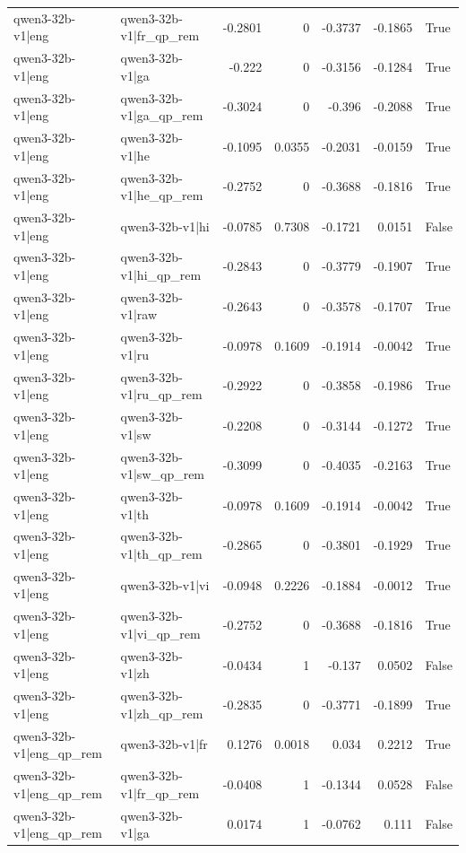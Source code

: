 \begin{table}
\begin{tabular}{l l r r r r l}
qwen3-32b-v1|eng & qwen3-32b-v1|fr_qp_rem & -0.2801 & 0 & -0.3737 & -0.1865 & True \\
qwen3-32b-v1|eng & qwen3-32b-v1|ga & -0.222 & 0 & -0.3156 & -0.1284 & True \\
qwen3-32b-v1|eng & qwen3-32b-v1|ga_qp_rem & -0.3024 & 0 & -0.396 & -0.2088 & True \\
qwen3-32b-v1|eng & qwen3-32b-v1|he & -0.1095 & 0.0355 & -0.2031 & -0.0159 & True \\
qwen3-32b-v1|eng & qwen3-32b-v1|he_qp_rem & -0.2752 & 0 & -0.3688 & -0.1816 & True \\
qwen3-32b-v1|eng & qwen3-32b-v1|hi & -0.0785 & 0.7308 & -0.1721 & 0.0151 & False \\
qwen3-32b-v1|eng & qwen3-32b-v1|hi_qp_rem & -0.2843 & 0 & -0.3779 & -0.1907 & True \\
qwen3-32b-v1|eng & qwen3-32b-v1|raw & -0.2643 & 0 & -0.3578 & -0.1707 & True \\
qwen3-32b-v1|eng & qwen3-32b-v1|ru & -0.0978 & 0.1609 & -0.1914 & -0.0042 & True \\
qwen3-32b-v1|eng & qwen3-32b-v1|ru_qp_rem & -0.2922 & 0 & -0.3858 & -0.1986 & True \\
qwen3-32b-v1|eng & qwen3-32b-v1|sw & -0.2208 & 0 & -0.3144 & -0.1272 & True \\
qwen3-32b-v1|eng & qwen3-32b-v1|sw_qp_rem & -0.3099 & 0 & -0.4035 & -0.2163 & True \\
qwen3-32b-v1|eng & qwen3-32b-v1|th & -0.0978 & 0.1609 & -0.1914 & -0.0042 & True \\
qwen3-32b-v1|eng & qwen3-32b-v1|th_qp_rem & -0.2865 & 0 & -0.3801 & -0.1929 & True \\
qwen3-32b-v1|eng & qwen3-32b-v1|vi & -0.0948 & 0.2226 & -0.1884 & -0.0012 & True \\
qwen3-32b-v1|eng & qwen3-32b-v1|vi_qp_rem & -0.2752 & 0 & -0.3688 & -0.1816 & True \\
qwen3-32b-v1|eng & qwen3-32b-v1|zh & -0.0434 & 1 & -0.137 & 0.0502 & False \\
qwen3-32b-v1|eng & qwen3-32b-v1|zh_qp_rem & -0.2835 & 0 & -0.3771 & -0.1899 & True \\
qwen3-32b-v1|eng_qp_rem & qwen3-32b-v1|fr & 0.1276 & 0.0018 & 0.034 & 0.2212 & True \\
qwen3-32b-v1|eng_qp_rem & qwen3-32b-v1|fr_qp_rem & -0.0408 & 1 & -0.1344 & 0.0528 & False \\
qwen3-32b-v1|eng_qp_rem & qwen3-32b-v1|ga & 0.0174 & 1 & -0.0762 & 0.111 & False \\

\end{tabular}
\end{table}
